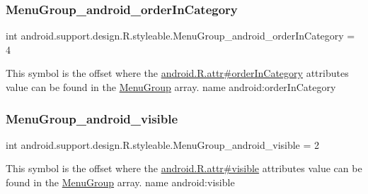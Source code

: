 \subsubsection{\texorpdfstring{Menu\+Group\+\_\+android\+\_\+order\+In\+Category}{MenuGroup\_android\_orderInCategory}}
{\footnotesize\ttfamily int android.\+support.\+design.\+R.\+styleable.\+Menu\+Group\+\_\+android\+\_\+order\+In\+Category = 4\hspace{0.3cm}{\ttfamily [static]}}

This symbol is the offset where the \hyperlink{}{android.\+R.\+attr\#order\+In\+Category} attribute\textquotesingle{}s value can be found in the \hyperlink{classandroid_1_1support_1_1design_1_1R_1_1styleable_a39805bd4a947832cbac3bd5f30eef344}{Menu\+Group} array.  name android\+:order\+In\+Category \mbox{\label{classandroid_1_1support_1_1design_1_1R_1_1styleable_a62b922817ddc433833e29afbd90027aa}} 
\subsubsection{\texorpdfstring{Menu\+Group\+\_\+android\+\_\+visible}{MenuGroup\_android\_visible}}
{\footnotesize\ttfamily int android.\+support.\+design.\+R.\+styleable.\+Menu\+Group\+\_\+android\+\_\+visible = 2\hspace{0.3cm}{\ttfamily [static]}}

This symbol is the offset where the \hyperlink{}{android.\+R.\+attr\#visible} attribute\textquotesingle{}s value can be found in the \hyperlink{classandroid_1_1support_1_1design_1_1R_1_1styleable_a39805bd4a947832cbac3bd5f30eef344}{Menu\+Group} array.  name android\+:visible \mbox{\label{classandroid_1_1support_1_1design_1_1R_1_1styleable_a4c90afdbb461f2bfba191da26fbc881c}} 
